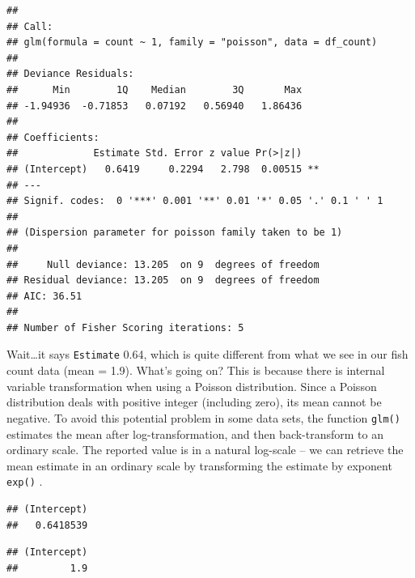 \documentclass[
]{book}
\newenvironment{Shaded}{\begin{snugshade}}{\end{snugshade}}
\newcommand{\CommentTok}[1]{\textcolor[rgb]{0.56,0.35,0.01}{\textit{#1}}}
\newcommand{\FunctionTok}[1]{\textcolor[rgb]{0.00,0.00,0.00}{#1}}
\newcommand{\NormalTok}[1]{#1}
\newcommand{\SpecialCharTok}[1]{\textcolor[rgb]{0.00,0.00,0.00}{#1}}
\begin{document}
\begin{verbatim}
## 
## Call:
## glm(formula = count ~ 1, family = "poisson", data = df_count)
## 
## Deviance Residuals: 
##      Min        1Q    Median        3Q       Max  
## -1.94936  -0.71853   0.07192   0.56940   1.86436  
## 
## Coefficients:
##             Estimate Std. Error z value Pr(>|z|)   
## (Intercept)   0.6419     0.2294   2.798  0.00515 **
## ---
## Signif. codes:  0 '***' 0.001 '**' 0.01 '*' 0.05 '.' 0.1 ' ' 1
## 
## (Dispersion parameter for poisson family taken to be 1)
## 
##     Null deviance: 13.205  on 9  degrees of freedom
## Residual deviance: 13.205  on 9  degrees of freedom
## AIC: 36.51
## 
## Number of Fisher Scoring iterations: 5
\end{verbatim}

Wait\ldots it says \texttt{Estimate} 0.64, which is quite different from what we see in our fish count data (mean = 1.9). What's going on? This is because there is internal variable transformation when using a Poisson distribution. Since a Poisson distribution deals with positive integer (including zero), its mean cannot be negative. To avoid this potential problem in some data sets, the function \texttt{glm()} estimates the mean after log-transformation, and then back-transform to an ordinary scale. The reported value is in a natural log-scale -- we can retrieve the mean estimate in an ordinary scale by transforming the estimate by exponent \texttt{exp()} .

\begin{Shaded}
\end{Shaded}

\begin{verbatim}
## (Intercept) 
##   0.6418539
\end{verbatim}

\begin{Shaded}
\end{Shaded}

\begin{verbatim}
## (Intercept) 
##         1.9
\end{verbatim}
\end{document}
